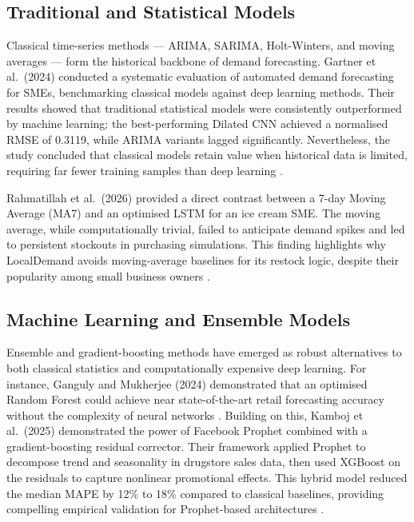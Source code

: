\documentclass[conference]{IEEEtran}
\begin{document}
\subsection{Traditional and Statistical Models}

Classical time-series methods --- ARIMA, SARIMA, Holt-Winters, and
moving averages --- form the historical backbone of demand forecasting.
Gartner et al.\ (2024) conducted a systematic evaluation of automated
demand forecasting for SMEs, benchmarking classical models against deep
learning methods. Their results showed that traditional statistical models 
were consistently outperformed by machine learning; the best-performing 
Dilated CNN achieved a normalised RMSE of 0.3119, while ARIMA variants
lagged significantly. Nevertheless, the study concluded that classical 
models retain value when historical data is limited, requiring far fewer 
training samples than deep learning \cite{gartner2024}.

Rahmatillah et al.\ (2026) provided a direct contrast between a 7-day 
Moving Average (MA7) and an optimised LSTM for an ice cream SME. The 
moving average, while computationally trivial, failed to anticipate demand 
spikes and led to persistent stockouts in purchasing simulations. This 
finding highlights why LocalDemand avoids moving-average baselines for its 
restock logic, despite their popularity among small business owners 
\cite{rahmatillah2026}.

\subsection{Machine Learning and Ensemble Models}

Ensemble and gradient-boosting methods have emerged as robust alternatives
to both classical statistics and computationally expensive deep learning. 
For instance, Ganguly and Mukherjee (2024) demonstrated that an optimised 
Random Forest could achieve near state-of-the-art retail forecasting accuracy 
without the complexity of neural networks \cite{ganguly2024}. Building on 
this, Kamboj et al.\ (2025) demonstrated the power of Facebook Prophet combined 
with a gradient-boosting residual corrector. Their framework applied Prophet 
to decompose trend and seasonality in drugstore sales data, then used XGBoost 
on the residuals to capture nonlinear promotional effects. This hybrid model 
reduced the median MAPE by 12\% to 18\% compared to classical baselines, 
providing compelling empirical validation for Prophet-based architectures 
\cite{kamboj2025}.
\end{document}
